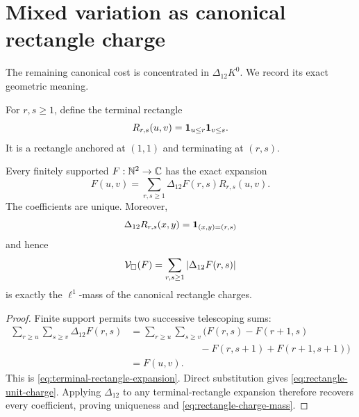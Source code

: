 \section{Mixed variation as canonical rectangle charge}
\label{sec:rectangle-charges}

The remaining canonical cost is concentrated in
\(\Delta_{12}K^0\).  We record its exact geometric meaning.

For \(r,s\ge1\), define the terminal rectangle
\begin{equation}
 R_{r,s}(u,v)=\mathbf 1_{u\le r}\mathbf 1_{v\le s}.
 \label{eq:terminal-rectangle}
\end{equation}
It is a rectangle anchored at \((1,1)\) and terminating at \((r,s)\).

\begin{theorem}
\label{thm:terminal-rectangle-expansion}
Every finitely supported \(F:\mathbb N^2\to\mathbb C\) has the exact expansion
\begin{equation}
 \boxed{
 F(u,v)
 =
 \sum_{r,s\ge1}
 \Delta_{12}F(r,s)R_{r,s}(u,v).}
 \label{eq:terminal-rectangle-expansion}
\end{equation}
The coefficients are unique.  Moreover,
\begin{equation}
 \Delta_{12}R_{r,s}(x,y)=\mathbf 1_{(x,y)=(r,s)}
 \label{eq:rectangle-unit-charge}
\end{equation}
and hence
\begin{equation}
 \mathcal V_\square(F)
 =
 \sum_{r,s\ge1}|\Delta_{12}F(r,s)|
 \label{eq:rectangle-charge-mass}
\end{equation}
is exactly the \(\ell^1\)-mass of the canonical rectangle charges.
\end{theorem}

\begin{proof}
Finite support permits two successive telescoping sums:
\begin{align*}
 \sum_{r\ge u}\sum_{s\ge v}\Delta_{12}F(r,s)
 &=
 \sum_{r\ge u}\sum_{s\ge v}
 \bigl(
 F(r,s)-F(r+1,s)\\
 &\hspace{3cm}
 -F(r,s+1)+F(r+1,s+1)
 \bigr)\\
 &=F(u,v).
\end{align*}
This is \eqref{eq:terminal-rectangle-expansion}.  Direct substitution gives
\eqref{eq:rectangle-unit-charge}.  Applying \(\Delta_{12}\) to any
terminal-rectangle expansion therefore recovers every coefficient, proving
uniqueness and \eqref{eq:rectangle-charge-mass}.
\end{proof}

